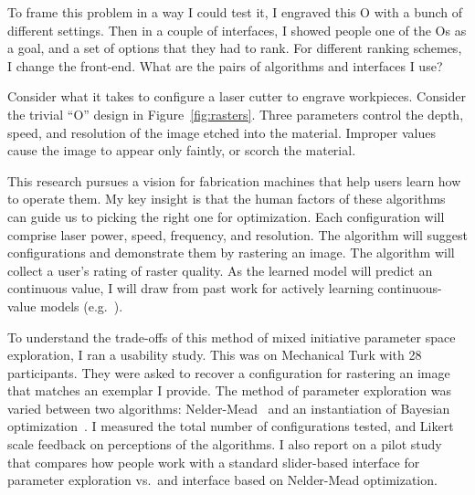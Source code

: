 To frame this problem in a way I could test it, I engraved this O with a bunch of different settings.
Then in a couple of interfaces, I showed people one of the Os as a goal, and a set of options that they had to rank.
For different ranking schemes, I change the front-end.
What are the pairs of algorithms and interfaces I use?

Consider what it takes to configure a laser cutter to engrave workpieces.
Consider the trivial ``O'' design in Figure~\ref{fig:rasters}.
Three parameters control the depth, speed, and resolution of the image etched into the material.
Improper values cause the image to appear only faintly, or scorch the material.

This research pursues a vision for fabrication machines that help users learn how to operate them.
My key insight is that the human factors of these algorithms can guide us to picking the right one for optimization.
Each configuration will comprise laser power, speed, frequency, and resolution.
The algorithm will suggest configurations and demonstrate them by rastering an image.
The algorithm will collect a user's rating of raster quality.
As the learned model will predict an continuous value, I will draw from past work for actively learning continuous-value models (e.g.~\cite{sugiyama_active_2008}).

To understand the trade-offs of this method of mixed initiative parameter space exploration, I ran a usability study.
This was on Mechanical Turk with 28 participants.
They were asked to recover a configuration for rastering an image that matches an exemplar I provide.
The method of parameter exploration was varied between two algorithms: Nelder-Mead~\cite{nelder_simplex_1964} and an instantiation of Bayesian optimization~\cite{brochu_tutorial_2010}.
I measured the total number of configurations tested, and Likert scale feedback on perceptions of the algorithms.
I also report on a pilot study that compares how people work with a standard slider-based interface for parameter exploration vs.\ and interface based on Nelder-Mead optimization.
